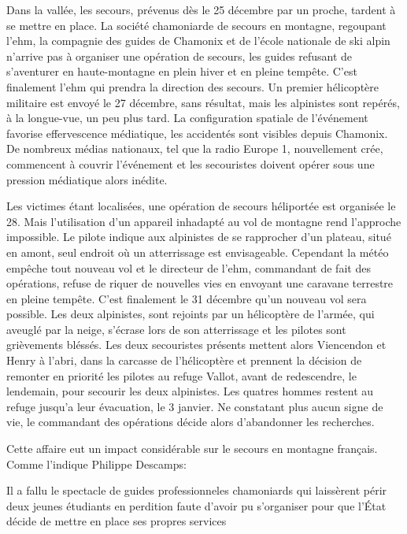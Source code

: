 Dans la vallée, les secours, prévenus dès le 25 décembre par un
proche, tardent à se mettre en place. La société chamoniarde de
secours en montagne, regoupant l'\ac{ehm}, la compagnie des guides de
Chamonix et de l'école nationale de ski alpin n'arrive pas à organiser
une opération de secours, les guides refusant de s'aventurer en
haute-montagne en plein hiver et en pleine tempête. C'est finalement
l'\ac{ehm} qui prendra la direction des secours. Un premier
hélicoptère militaire est envoyé le 27 décembre, sans résultat, mais
les alpinistes sont repérés, à la longue-vue, un peu plus tard. La
configuration spatiale de l'événement favorise effervescence
médiatique, les accidentés sont visibles depuis Chamonix. De nombreux
médias nationaux, tel que la radio Europe 1, nouvellement crée,
commencent à couvrir l'événement et les secouristes doivent opérer
sous une pression médiatique alors inédite.

Les victimes étant localisées, une opération de secours héliportée est
organisée le 28. Mais l'utilisation d'un appareil inhadapté au vol de
montagne rend l'approche impossible. Le pilote indique aux alpinistes
de se rapprocher d'un plateau, situé en amont, seul endroit où un
atterrissage est envisageable. Cependant la météo empêche tout nouveau
vol et le directeur de l'\ac{ehm}, commandant de fait des opérations,
refuse de riquer de nouvelles vies en envoyant une caravane terrestre
en pleine tempête. C'est finalement le 31 décembre qu'un nouveau vol
sera possible. Les deux alpinistes, sont rejoints par un hélicoptère
de l'armée, qui aveuglé par la neige, s'écrase lors de son
atterrissage et les pilotes sont grièvements bléssés. Les deux
secouristes présents mettent alors Viencendon et Henry à l'abri, dans
la carcasse de l'hélicoptère et prennent la décision de remonter en
priorité les pilotes au refuge Vallot, avant de redescendre, le
lendemain, pour secourir les deux alpinistes. Les quatres hommes
restent au refuge jusqu'a leur évacuation, le 3 janvier. Ne constatant
plus aucun signe de vie, le commandant des opérations décide alors
d'abandonner les recherches.

Cette affaire eut un impact considérable sur le secours en montagne
français. Comme l'indique  Philippe Descamps:

\begin{displayquote}
  \og Il a fallu le spectacle de guides professionneles chamoniards
  qui laissèrent périr deux jeunes étudiants en perdition faute
  d'avoir pu s'organiser pour que l'État décide de mettre en place ses
  propres services \textelp{}\fg{}
\end{displayquote}

